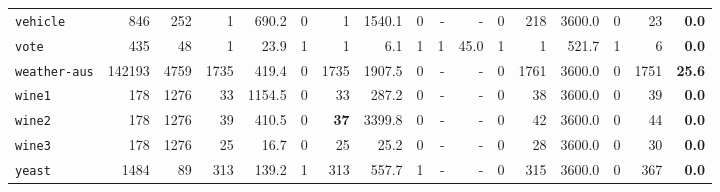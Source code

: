 \begin{tabular}{lccrrrrrrrrrrrrrr}
\texttt{vehicle} & \multicolumn{1}{r}{846} & \multicolumn{1}{r}{252}  & 1 & 690.2 & 0 & 1 & 1540.1 & 0 & - & - & 0 & 218 & 3600.0 & 0 & 23 & \textbf{0.0}\\
\texttt{vote} & \multicolumn{1}{r}{435} & \multicolumn{1}{r}{48}  & 1 & 23.9 & 1 & 1 & 6.1 & 1 & 1 & 45.0 & 1 & 1 & 521.7 & 1 & 6 & \textbf{0.0}\\
\texttt{weather-aus} & \multicolumn{1}{r}{142193} & \multicolumn{1}{r}{4759}  & 1735 & 419.4 & 0 & 1735 & 1907.5 & 0 & - & - & 0 & 1761 & 3600.0 & 0 & 1751 & \textbf{25.6}\\
\texttt{wine1} & \multicolumn{1}{r}{178} & \multicolumn{1}{r}{1276}  & 33 & 1154.5 & 0 & 33 & 287.2 & 0 & - & - & 0 & 38 & 3600.0 & 0 & 39 & \textbf{0.0}\\
\texttt{wine2} & \multicolumn{1}{r}{178} & \multicolumn{1}{r}{1276}  & 39 & 410.5 & 0 & \textbf{37} & 3399.8 & 0 & - & - & 0 & 42 & 3600.0 & 0 & 44 & \textbf{0.0}\\
\texttt{wine3} & \multicolumn{1}{r}{178} & \multicolumn{1}{r}{1276}  & 25 & 16.7 & 0 & 25 & 25.2 & 0 & - & - & 0 & 28 & 3600.0 & 0 & 30 & \textbf{0.0}\\
\texttt{yeast} & \multicolumn{1}{r}{1484} & \multicolumn{1}{r}{89}  & 313 & 139.2 & 1 & 313 & 557.7 & 1 & - & - & 0 & 315 & 3600.0 & 0 & 367 & \textbf{0.0}\\
\bottomrule
\end{tabular}

